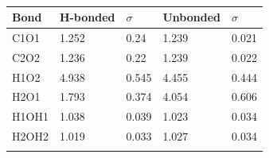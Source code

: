 \begin{table}
    \begin{tabular}{|l|l|l|l|l|}
        \hline
        Bond  & H-bonded & $\sigma$  & Unbonded & $\sigma$ \\ 
				\hline
        C1O1  & 1.252 & 0.24  & 1.239 & 0.021 \\ 
        C2O2  & 1.236 & 0.22  & 1.239 & 0.022 \\ 
        H1O2  & 4.938 & 0.545 & 4.455 & 0.444 \\ 
        H2O1  & 1.793 & 0.374 & 4.054 & 0.606 \\ 
        H1OH1 & 1.038 & 0.039 & 1.023 & 0.034 \\ 
        H2OH2 & 1.019 & 0.033 & 1.027 & 0.034 \\ \hline
		\label{table:peaks}
    \end{tabular}
		\caption{}
\end{table}

